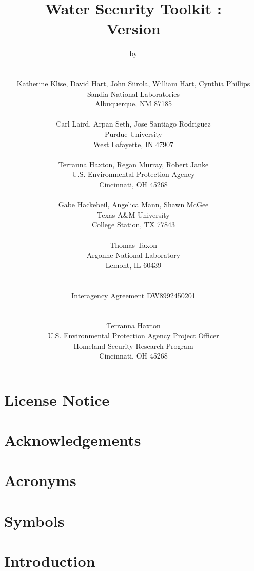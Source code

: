 \documentclass[pdf,oneside]{book}
\title{\sc Water Security Toolkit \docTitle:\\Version \wstversion}
\author{
	by\\
	\\\\
	Katherine Klise, David Hart, John Siirola, William Hart, Cynthia Phillips \\
	Sandia National Laboratories\\
	Albuquerque, NM 87185\\
	\\
	Carl Laird, Arpan Seth, Jose Santiago Rodriguez\\
	Purdue University\\
	West Lafayette, IN 47907\\
	\\
	Terranna Haxton, Regan Murray, Robert Janke\\
	U.S. Environmental Protection Agency\\
	Cincinnati, OH 45268\\
	\\
	Gabe Hackebeil, Angelica Mann, Shawn McGee\\
	Texas A\&M University\\
	College Station, TX 77843\\
	\\
	Thomas Taxon\\
	Argonne National Laboratory\\
	Lemont, IL 60439\\
	\\\\
	Interagency Agreement DW8992450201 \\
	\\\\
	Terranna Haxton\\
	U.S. Environmental Protection Agency Project Officer \\
	Homeland Security Research Program \\
	Cincinnati, OH 45268
}
\date{}
\newif\ifEPAReport
\begin{document}
  \ifEPAReport
    
    \maketitle
  \else
    
    
    
  \fi
  
  \clearpage
%  
  
  \clearpage
  \ifEPAReport
    \chapter*{Disclaimer}
    
  \fi
  

  \clearpage
  \chapter*{License Notice}
  

  \clearpage
  \chapter*{Acknowledgements}
  \ifEPAReport
    
  \else
    
  \fi
  
  \clearpage
  \chapter*{Acronyms}
  
  
  \clearpage
  \chapter*{Symbols}
  
  
  \cleardoublepage
  \tableofcontents
  \clearpage
  \listoffigures

  \clearpage

  \chapter{Introduction}
  
\end{document}
